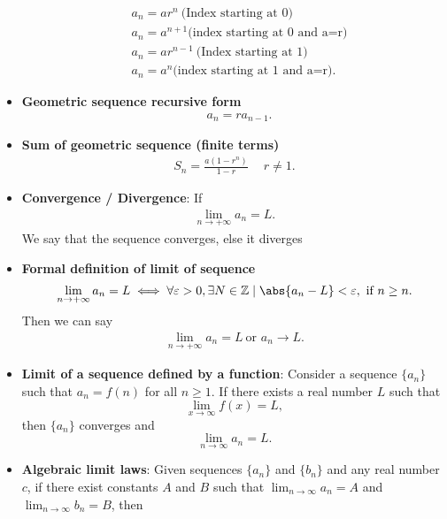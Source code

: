 \documentclass{report}
\begin{document}
\begin{itemize}
\begin{align*}
            &a_{n} = ar^{n}\ \text{(Index starting at 0)} \\
            &a_{n} = a^{n+1} \text{(index starting at 0 and a=r)} \\
            &a_{n} = ar^{n-1}\ \text{(Index starting at 1)} \\
            &a_{n} = a^{n} \text{(index starting at 1 and a=r)}
        .\end{align*}
    \item \textbf{Geometric sequence recursive form}
        \begin{align*}
            &a_{n} = ra_{n-1}
        .\end{align*}
    \item \textbf{Sum of geometric sequence (finite terms)}
        \begin{align*}
            S_{n} = \frac{a(1-r^{n})}{1-r}\ \quad r\ne 1
        .\end{align*}
    \item \textbf{Convergence / Divergence}: If 
        \begin{align*}
            \lim\limits_{n \to +\infty}{a_{n}} = L
        .\end{align*}
        We say that the sequence converges, else it diverges
    \item \textbf{Formal definition of limit of sequence}
        \begin{align*}
            \lim\limits_{n \to +\infty}{a_{n}= L} \iff \forall \varepsilon > 0, \exists N \in \mathbb{Z} \mid \abs{a_{n} - L} < \varepsilon,\ \text{if } n \geq n
        .\end{align*}
        Then we can say 
        \begin{align*}
            \lim\limits_{n \to +\infty}{a_{n} = L}\ \text{or } a_{n} \rightarrow L 
        .\end{align*}
    \item \textbf{Limit of a sequence defined by a function}:         Consider a sequence \( \{a_n\} \) such that \( a_n = f(n) \) for all \( n \geq 1 \). If there exists a real number \( L \) such that
        \[
            \lim_{{x \to \infty}} f(x) = L,
        \]
        then \( \{a_n\} \) converges and
        \[
            \lim_{{n \to \infty}} a_n = L.
        \]
    \item \textbf{Algebraic limit laws}:
        Given sequences \( \{a_n\} \) and \( \{b_n\} \) and any real number \( c \), if there exist constants \( A \) and \( B \) such that \( \lim_{{n \to \infty}} a_n = A \) and \( \lim_{{n \to \infty}} b_n = B \), then

\end{itemize}
\end{document}
